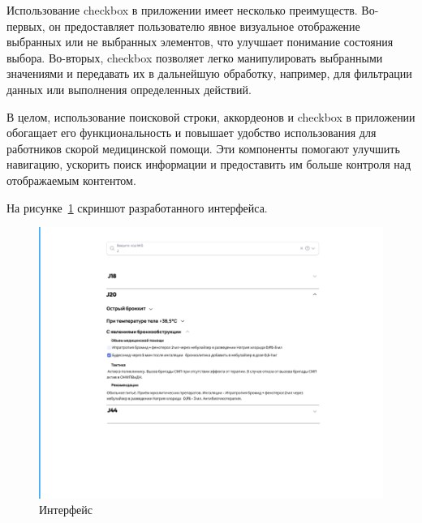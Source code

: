 Использование checkbox в приложении имеет несколько преимуществ. Во-первых, он предоставляет пользователю явное визуальное отображение выбранных или не выбранных элементов, что улучшает понимание состояния выбора. Во-вторых, checkbox позволяет легко манипулировать выбранными значениями и передавать их в дальнейшую обработку, например, для фильтрации данных или выполнения определенных действий.

В целом, использование поисковой строки, аккордеонов и checkbox в приложении обогащает его функциональность и повышает удобство использования для работников скорой медицинской помощи. Эти компоненты помогают улучшить навигацию, ускорить поиск информации и предоставить им больше контроля над отображаемым контентом.

На рисунке~\ref{fig:fig12} скриншот разработанного интерфейса.

     \begin{figure}
        \includegraphics[scale=0.6]{styles/diploma/inc/prim.png}
        \caption{Интерфейс}
        \label{fig:fig12}
    \end{figure}
